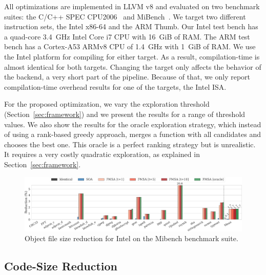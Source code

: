 All optimizations are implemented in LLVM v8 and evaluated on two benchmark suites: the C/C++ SPEC CPU2006~\cite{spec} and MiBench~\cite{mibench01}.
We target two different instruction sets, the Intel x86-64 and the ARM Thumb. Our Intel test bench has a quad-core 3.4~GHz Intel Core i7 CPU with 16~GiB of RAM.
The ARM test bench has a Cortex-A53 ARMv8 CPU of 1.4~GHz with 1~GiB of RAM.
We use the Intel platform for compiling for either target. As a result, compilation-time is almost
identical for both targets. Changing the target only affects the behavior of the backend, a very
short part of the pipeline. Because of that, we only report compilation-time overhead results for
one of the targets, the Intel ISA.

For the proposed optimization, we vary the exploration threshold (Section~\ref{sec:framework})
and we present the results for a range of threshold values. We also show the results for the oracle exploration strategy, which
instead of using a rank-based greedy approach, merges a function with all candidates and chooses the best one.
This oracle is a perfect ranking strategy but is unrealistic. It requires a very costly quadratic exploration, as explained in
Section~\ref{sec:framework}. 


\begin{figure}[t]
  \centering
  \includegraphics[width=\linewidth]{figs/code-size-reduction-mibench.pdf}
	\caption{Object file size reduction for Intel on the Mibench benchmark suite.}
  \label{fig:code-size-reduction-mibench}
\end{figure}

\subsection{Code-Size Reduction}

